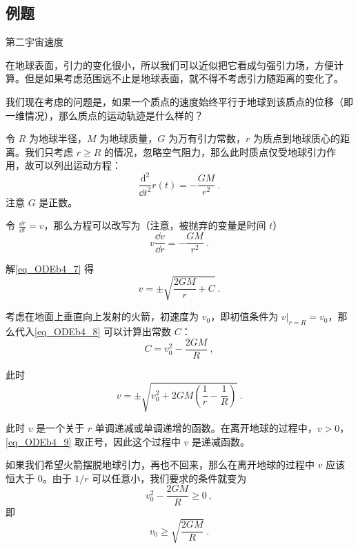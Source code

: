 \subsection{例题}

\begin{example}{第二宇宙速度}

在地球表面，引力的变化很小，所以我们可以近似把它看成匀强引力场，方便计算。但是如果考虑范围远不止是地球表面，就不得不考虑引力随距离的变化了。

我们现在考虑的问题是，如果一个质点的速度始终平行于地球到该质点的位移（即一维情况），那么质点的运动轨迹是什么样的？

令 $R$ 为地球半径，$M$ 为地球质量，$G$ 为万有引力常数，$r$ 为质点到地球质心的距离。我们只考虑 $r\geq R$ 的情况，忽略空气阻力，那么此时质点仅受地球引力作用，故可以列出运动方程：
\begin{equation}
\frac{\mathrm{d}^2}{\dd t^2}r(t)=-\frac{GM}{r^2}~.
\end{equation}
注意 $G$ 是正数。

令 $\frac{\dd r}{\dd t}=v$，那么方程可以改写为（注意，被抛弃的变量是时间 $t$）
\begin{equation}\label{eq_ODEb4_7}
v\frac{\dd v}{\dd r}=-\frac{GM}{r^2}~.
\end{equation}

解\autoref{eq_ODEb4_7} 得
\begin{equation}\label{eq_ODEb4_8}
v=\pm\sqrt{\frac{2GM}{r}+C}~.
\end{equation}

考虑在地面上垂直向上发射的火箭，初速度为 $v_0$，即初值条件为 $v|_{r=R}=v_0$，那么代入\autoref{eq_ODEb4_8} 可以计算出常数 $C$：
\begin{equation}
C=v_0^2-\frac{2GM}{R}~,
\end{equation}

此时
\begin{equation}\label{eq_ODEb4_9}
v=\pm\sqrt{v_0^2+2GM(\frac{1}{r}-\frac{1}{R})}~.
\end{equation}

此时 $v$ 是一个关于 $r$ 单调递减或单调递增的函数。在离开地球的过程中，$v>0$，\autoref{eq_ODEb4_9} 取正号，因此这个过程中 $v$ 是递减函数。

如果我们希望火箭摆脱地球引力，再也不回来，那么在离开地球的过程中 $v$ 应该恒大于 $0$。由于 $1/r$ 可以任意小，我们要求的条件就变为
\begin{equation}
v_0^2-\frac{2GM}{R}\geq 0~,
\end{equation}
即
\begin{equation}
v_0\geq\sqrt{\frac{2GM}{R}}~.
\end{equation}


\end{example}
